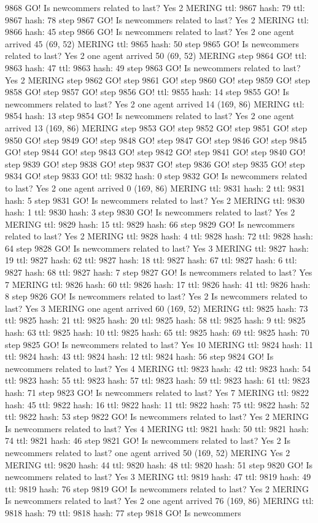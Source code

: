 9868 GO! Is newcommers related to last? Yes 2 MERING ttl: 9867 hash: 79 ttl: 9867 hash: 78 step 9867 GO! Is newcommers related to last? Yes 2 MERING ttl: 9866 hash: 45 step 9866 GO! Is newcommers related to last? Yes 2 one agent arrived 45 (69, 52) MERING ttl: 9865 hash: 50 step 9865 GO! Is newcommers related to last? Yes 2 one agent arrived 50 (69, 52) MERING step 9864 GO! ttl: 9863 hash: 47 ttl: 9863 hash: 49 step 9863 GO! Is newcommers related to last? Yes 2 MERING step 9862 GO! step 9861 GO! step 9860 GO! step 9859 GO! step 9858 GO! step 9857 GO! step 9856 GO! ttl: 9855 hash: 14 step 9855 GO! Is newcommers related to last? Yes 2 one agent arrived 14 (169, 86) MERING ttl: 9854 hash: 13 step 9854 GO! Is newcommers related to last? Yes 2 one agent arrived 13 (169, 86) MERING step 9853 GO! step 9852 GO! step 9851 GO! step 9850 GO! step 9849 GO! step 9848 GO! step 9847 GO! step 9846 GO! step 9845 GO! step 9844 GO! step 9843 GO! step 9842 GO! step 9841 GO! step 9840 GO! step 9839 GO! step 9838 GO! step 9837 GO! step 9836 GO! step 9835 GO! step 9834 GO! step 9833 GO! ttl: 9832 hash: 0 step 9832 GO! Is newcommers related to last? Yes 2 one agent arrived 0 (169, 86) MERING ttl: 9831 hash: 2 ttl: 9831 hash: 5 step 9831 GO! Is newcommers related to last? Yes 2 MERING ttl: 9830 hash: 1 ttl: 9830 hash: 3 step 9830 GO! Is newcommers related to last? Yes 2 MERING ttl: 9829 hash: 15 ttl: 9829 hash: 66 step 9829 GO! Is newcommers related to last? Yes 2 MERING ttl: 9828 hash: 4 ttl: 9828 hash: 72 ttl: 9828 hash: 64 step 9828 GO! Is newcommers related to last? Yes 3 MERING ttl: 9827 hash: 19 ttl: 9827 hash: 62 ttl: 9827 hash: 18 ttl: 9827 hash: 67 ttl: 9827 hash: 6 ttl: 9827 hash: 68 ttl: 9827 hash: 7 step 9827 GO! Is newcommers related to last? Yes 7 MERING ttl: 9826 hash: 60 ttl: 9826 hash: 17 ttl: 9826 hash: 41 ttl: 9826 hash: 8 step 9826 GO! Is newcommers related to last? Yes 2 Is newcommers related to last? Yes 3 MERING one agent arrived 60 (169, 52) MERING ttl: 9825 hash: 73 ttl: 9825 hash: 21 ttl: 9825 hash: 20 ttl: 9825 hash: 58 ttl: 9825 hash: 9 ttl: 9825 hash: 63 ttl: 9825 hash: 10 ttl: 9825 hash: 65 ttl: 9825 hash: 69 ttl: 9825 hash: 70 step 9825 GO! Is newcommers related to last? Yes 10 MERING ttl: 9824 hash: 11 ttl: 9824 hash: 43 ttl: 9824 hash: 12 ttl: 9824 hash: 56 step 9824 GO! Is newcommers related to last? Yes 4 MERING ttl: 9823 hash: 42 ttl: 9823 hash: 54 ttl: 9823 hash: 55 ttl: 9823 hash: 57 ttl: 9823 hash: 59 ttl: 9823 hash: 61 ttl: 9823 hash: 71 step 9823 GO! Is newcommers related to last? Yes 7 MERING ttl: 9822 hash: 45 ttl: 9822 hash: 16 ttl: 9822 hash: 11 ttl: 9822 hash: 75 ttl: 9822 hash: 52 ttl: 9822 hash: 53 step 9822 GO! Is newcommers related to last? Yes 2 MERING Is newcommers related to last? Yes 4 MERING ttl: 9821 hash: 50 ttl: 9821 hash: 74 ttl: 9821 hash: 46 step 9821 GO! Is newcommers related to last? Yes 2 Is newcommers related to last? one agent arrived 50 (169, 52) MERING Yes 2 MERING ttl: 9820 hash: 44 ttl: 9820 hash: 48 ttl: 9820 hash: 51 step 9820 GO! Is newcommers related to last? Yes 3 MERING ttl: 9819 hash: 47 ttl: 9819 hash: 49 ttl: 9819 hash: 76 step 9819 GO! Is newcommers related to last? Yes 2 MERING Is newcommers related to last? Yes 2 one agent arrived 76 (169, 86) MERING ttl: 9818 hash: 79 ttl: 9818 hash: 77 step 9818 GO! Is newcommers 